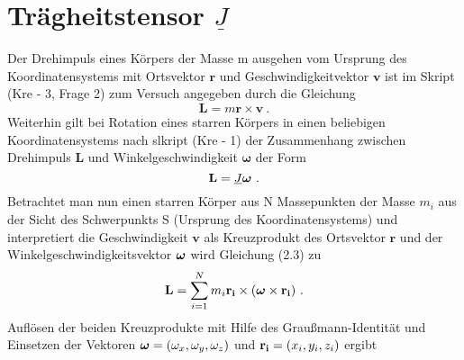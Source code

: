 

\section{Trägheitstensor $\underline{J}$}
\label{sec: Traegheitstensor}

Der Drehimpuls eines Körpers der Masse m ausgehen vom Ursprung des Koordinatensystems mit Ortsvektor $\mathbf{r}$ und Geschwindigkeitvektor $\mathbf{v}$ ist im Skript (Kre - 3, Frage 2) zum Versuch angegeben durch die Gleichung
\begin{equation}
    \mathbf{L}=m\mathbf{r}\times\mathbf{v}~.
\end{equation}
Weiterhin gilt bei Rotation eines starren Körpers in einen beliebigen Koordinatensystems nach slkript (Kre - 1) der Zusammenhang zwischen Drehimpuls $\mathbf{L}$ und Winkelgeschwindigkeit $\mathbf{\omega}$ der Form
\begin{equation}
    \mathbf{L}=\underline{J}\vect{\omega}~.
\end{equation}
\newpage
Betrachtet man nun einen starren Körper aus N Massepunkten der Masse $m_i$ aus der Sicht des Schwerpunkts S (Ursprung des Koordinatensystems) und interpretiert die Geschwindigkeit $\mathbf{v}$ als Kreuzprodukt des Ortsvektor $\mathbf{r}$ und der Winkelgeschwindigkeitsvektor $\vect{\omega}$ wird Gleichung (2.3) zu
\begin{gather}
    \vect{L}=\sum_{i=1}^{N} m_i\vect{r_i}\times(\vect{\omega}\times\vect{r_i})~.
\end{gather}
Auflösen der beiden Kreuzprodukte mit Hilfe des Graußmann-Identität und Einsetzen der Vektoren $\vect{\omega}=(\omega_x,\omega_y, \omega_z)$ und $\vect{r_i}=(x_i, y_i, z_i)$ ergibt
